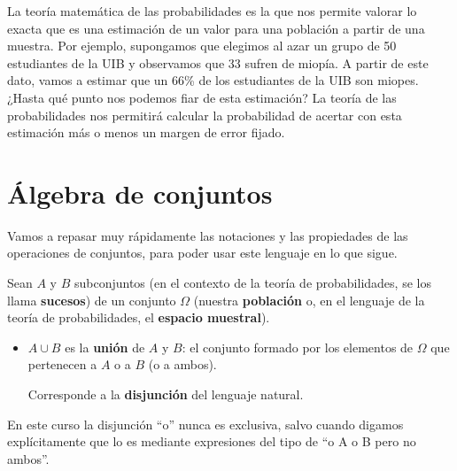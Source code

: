 \documentclass[
]{book}
\theoremstyle{definition}
\theoremstyle{definition}
\theoremstyle{definition}
\theoremstyle{definition}
\theoremstyle{remark}
\begin{document}
La teoría matemática de las probabilidades es la que nos permite valorar lo exacta que es una estimación de un valor para una población a partir de una muestra. Por ejemplo, supongamos que elegimos al azar un grupo de 50 estudiantes de la UIB y observamos que 33 sufren de miopía. A partir de este dato, vamos a estimar que un 66\% de los estudiantes de la UIB son miopes. ¿Hasta qué punto nos podemos fiar de esta estimación? La teoría de las probabilidades nos permitirá calcular la probabilidad de acertar con esta estimación más o menos un margen de error fijado.

\hypertarget{uxe1lgebra-de-conjuntos}{%
\section{Álgebra de conjuntos}\label{uxe1lgebra-de-conjuntos}}

Vamos a repasar muy rápidamente las notaciones y las propiedades de las operaciones de conjuntos, para poder usar este lenguaje en lo que sigue.

Sean \(A\) y \(B\) subconjuntos (en el contexto de la teoría de probabilidades, se los llama \textbf{sucesos}) de un conjunto \(\Omega\) (nuestra \textbf{población} o, en el lenguaje de la teoría de probabilidades, el \textbf{espacio muestral}).

\begin{itemize}
\item
  \(A\cup B\) es la \textbf{unión} de \(A\) y \(B\): el conjunto formado por los elementos de \(\Omega\) que pertenecen a \(A\) o a \(B\) (o a ambos).

  Corresponde a la \textbf{disjunción} del lenguaje natural.
\end{itemize}

\begin{rmdimportant}
En este curso la disjunción ``o'' nunca es exclusiva, salvo cuando digamos explícitamente que lo es mediante expresiones del tipo de ``o A o B pero no ambos''.
\end{rmdimportant}
\end{document}
